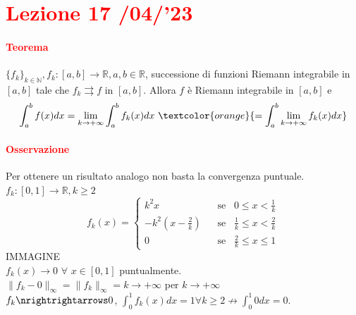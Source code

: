 \documentclass{article}
\newcommand{\R}{\mathbb{R}}
\newcommand{\N}{\mathbb{N}}
\begin{document}
\newpage
\section{\textcolor{red}{Lezione 17 \space{}/04/'23}}
\paragraph{\textcolor{red}{Teorema}}
$\{f_k\}_{k\in\N}, f_k:[a,b]\rightarrow\R,a,b\in\R$, successione di funzioni Riemann integrabile in $[a,b]$ tale che $f_k \rightrightarrows f$ in $[a,b]$. Allora $f$ è Riemann integrabile in $[a,b]$ e 
\begin{equation*}
    \int_{a}^{b}f(x)dx=\lim_{k\rightarrow+\infty}\int_{a}^{b}f_k(x)dx\,\, \textcolor{orange}{ = \int_{a}^{b}\lim_{k \rightarrow +\infty} f_k(x)dx}
\end{equation*}

\paragraph{\textcolor{red}{Osservazione}}
Per ottenere un risultato analogo non basta la convergenza puntuale.\\ $f_k:[0,1]\rightarrow\R, k \geq 2$
\begin{equation*}
    f_k(x)=\begin{cases}
        k^2x \,\,\,\,\, &\text{se}\,\,\,\,\, 0 \leq x < \frac{1}{k}\\
        -k^2\left(x-\frac{2}{k}\right)\,\,\,\,\, &\text{se}\,\,\,\,\, \frac{1}{k} \leq x < \frac{2}{k} \\
        0 \,\,\,\,\,&\text{se}\,\,\,\,\, \frac{2}{k} \leq x \leq 1
    \end{cases}
\end{equation*}
IMMAGINE\\
$f_k(x) \rightarrow 0 \,\, \forall\,\, x \in [0,1]$ puntualmente.\\
$\parallel f_k-0\parallel_\infty =\parallel f_k\parallel_\infty=k \rightarrow +\infty$ per $k \rightarrow +\infty$\\
$f_k\nrightrightarrows 0$,  $\int_{0}^{1} f_k(x) dx=1 \forall k \geq 2 \nrightarrow \int_{0}^{1}0dx=0$.
\end{document}
